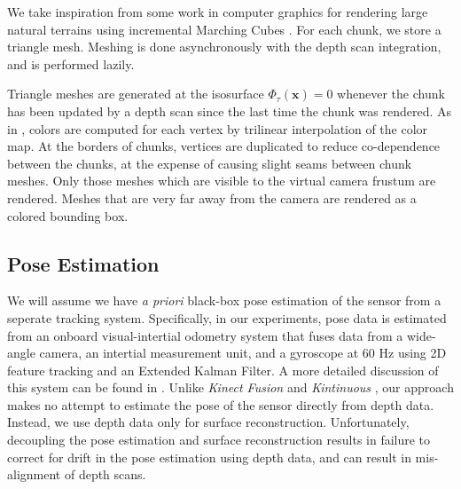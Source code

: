 \documentclass[10pt,twocolumn,letterpaper]{article}
\begin{document}
We take inspiration from some work in computer graphics for rendering large
natural terrains \cite{GPUGEMS3} using incremental Marching Cubes
\cite{Lorensen1987}. For each chunk, we store a triangle mesh.
Meshing is done asynchronously with the depth scan integration, and is
performed lazily. 

Triangle meshes are generated at the isosurface
$\Phi_{\tau}(\mathbf{x}) = 0$ whenever the chunk has been updated by a depth
scan since the last time the chunk was rendered. As in \cite{Bylow2013,
Whelan2013},  colors are computed for each vertex by trilinear interpolation of
the color map. At the borders of chunks, vertices are duplicated to reduce
co-dependence between the chunks, at the expense of causing slight seams
between chunk meshes. Only those meshes which are visible to the virtual camera
frustum are rendered. Meshes that are very far away from the camera are
rendered as a colored bounding box.

\subsection{Pose Estimation}
\label{section:pose}
We will assume we  have \textit{a priori} black-box pose estimation of the
sensor from a seperate tracking system. Specifically, in our experiments, pose
data is estimated from an onboard visual-intertial odometry system that fuses
data from a wide-angle camera, an intertial measurement unit, and a gyroscope at
60 Hz using 2D feature tracking and an Extended Kalman Filter. A more detailed
discussion of this system can be found in \cite{VINS}.  Unlike
\textit{Kinect Fusion} \cite{Newcombe} and \textit{Kintinuous}
\cite{Whelan2013}, our approach makes no attempt to estimate the pose of the
sensor directly from depth data. Instead, we use depth data only for surface
reconstruction. Unfortunately, decoupling the pose estimation and surface
reconstruction results in failure to correct for drift in the pose estimation
using depth data, and can result in mis-alignment of depth scans.
\end{document}
